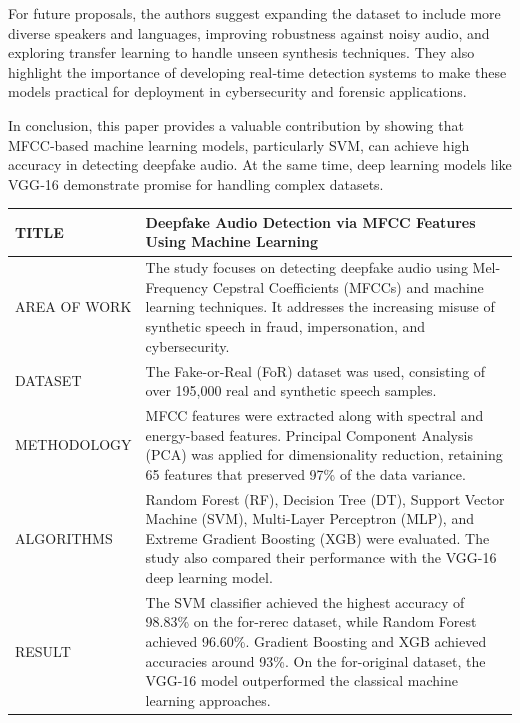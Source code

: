 \documentclass[12pt,a4paper]{report}
\begin{document}
For future proposals, the authors suggest expanding the dataset to include more diverse speakers and languages, improving robustness against noisy audio, and exploring transfer learning to handle unseen synthesis techniques. They also highlight the importance of developing real‑time detection systems to make these models practical for deployment in cybersecurity and forensic applications.

In conclusion, this paper provides a valuable contribution by showing that MFCC‑based machine learning models, particularly SVM, can achieve high accuracy in detecting deepfake audio. At the same time, deep learning models like VGG‑16 demonstrate promise for handling complex datasets. 

\renewcommand{\arraystretch}{1.5}

\begin{longtable}{|p{4cm}|p{11cm}|}
\hline
TITLE &
Deepfake Audio Detection via MFCC Features Using Machine Learning \\ \hline

AREA OF WORK &
The study focuses on detecting deepfake audio using Mel-Frequency Cepstral Coefficients (MFCCs) and machine learning techniques. It addresses the increasing misuse of synthetic speech in fraud, impersonation, and cybersecurity. \\ \hline

DATASET &
The Fake-or-Real (FoR) dataset was used, consisting of over 195,000 real and synthetic speech samples.   \\ \hline

METHODOLOGY &
MFCC features were extracted along with spectral and energy-based features. Principal Component Analysis (PCA) was applied for dimensionality reduction, retaining 65 features that preserved 97\% of the data variance. \\ \hline

ALGORITHMS &
Random Forest (RF), Decision Tree (DT), Support Vector Machine (SVM), Multi-Layer Perceptron (MLP), and Extreme Gradient Boosting (XGB) were evaluated. The study also compared their performance with the VGG-16 deep learning model. \\ \hline

RESULT &
The SVM classifier achieved the highest accuracy of 98.83\% on the for-rerec dataset, while Random Forest achieved 96.60\%. Gradient Boosting and XGB achieved accuracies around 93\%. On the for-original dataset, the VGG-16 model outperformed the classical machine learning approaches. \\ \hline


\end{longtable}
\end{document}
